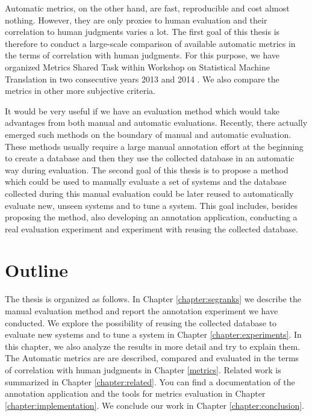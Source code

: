 Automatic metrics, on the other hand, are fast, reproducible and cost almost
nothing. However, they are only proxies to human evaluation and their
correlation to human judgments varies a lot. The first goal of this thesis is
therefore to conduct a large-scale comparison of available automatic metrics in
the terms of correlation with human judgments. For this purpose, we have
organized Metrics Shared Task within Workshop on Statistical Machine
Translation in two consecutive years 2013  and 2014
. We also compare the metrics in other more subjective
criteria. 

It would be very useful if we have an evaluation method which would take
advantages from both manual and automatic evaluations. Recently, there actually
emerged such methods on the boundary of manual and automatic evaluation. These
methods usually require a large manual annotation effort at the beginning to
create a database and then they use the collected database in an automatic way
during evaluation.  The second goal of this thesis is to propose a method which
could be used to manually evaluate a set of systems and the database collected
during this manual evaluation could be later reused to automatically evaluate
new, unseen systems and to tune a system. This goal includes, besides proposing
the method, also developing an annotation application, conducting a real
evaluation experiment and experiment with reusing the collected database. 

\section{Outline}

The thesis is organized as follows. In Chapter \ref{chapter:segranks} we
describe the manual evaluation method and report the annotation experiment we
have conducted. We explore the possibility of reusing the collected database to
evaluate new systems and to tune a system in Chapter \ref{chapter:experiments}.
In this chapter, we also analyze the results in more detail and try to explain
them.  The Automatic metrics are are described, compared and evaluated in the
terms of correlation with human judgments in Chapter \ref{metrics}. Related
work is summarized in Chapter \ref{chapter:related}. You can find a
documentation of the annotation application and the tools for metrics
evaluation in Chapter \ref{chapter:implementation}. We conclude our work in
Chapter \ref{chapter:conclusion}.





